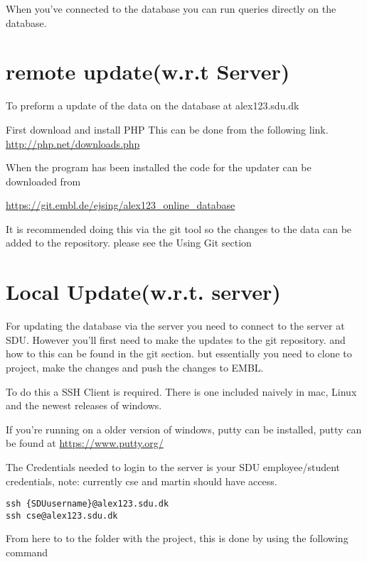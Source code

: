 \documentclass[a4paper,10pt,titlepage]{report}
\begin{document}
When you've connected to the database you can run queries directly on the database.
\newpage
\section{remote update(w.r.t Server)}

To preform a update of the data on the database at alex123.sdu.dk

First download and install PHP This can be done from the following link.
\\
\vspace{5mm}
\url{http://php.net/downloads.php}

\vspace{5mm}
When the program has been installed the code for the updater can be downloaded from
\vspace{5mm}

\url{https://git.embl.de/ejsing/alex123_online_database}

\vspace{5mm}
It is recommended doing this via the git tool so the changes to the data can be added to the repository. please see the Using Git section

\section{Local Update(w.r.t. server)}

For updating the database via the server you need to connect to the server at SDU. However you'll first need to make the updates to the git repository. and how to this can be found in the git section. but essentially you need to clone to project, make the changes and push the changes to EMBL.

To do this a SSH Client is required. There is one included naively in mac, Linux and the newest releases of windows.

If you're running on a older version of windows, putty can be installed, putty can be found at \url{https://www.putty.org/}
\vspace{5mm}

The Credentials needed to login to the server is your SDU employee/student credentials, note: currently cse and martin should have access.

\begin{lstlisting}
ssh {SDUusername}@alex123.sdu.dk
ssh cse@alex123.sdu.dk
\end{lstlisting}

From here to to the folder with the project, this is done by using the following command
\end{document}
